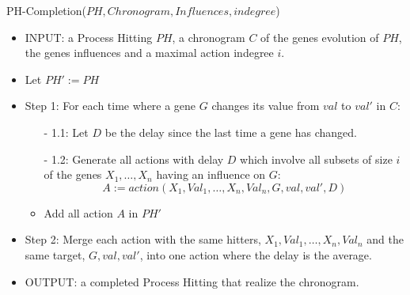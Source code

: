 \begin{algorithm}
	\caption{PH-Completion($PH,Chronogram,Influences,indegree$)}
	\label{alg:PHC_ap}
	\begin{itemize}
		\item INPUT: a Process Hitting $PH$, a chronogram $C$ of the genes evolution of $PH$, the genes influences and a maximal action indegree $i$.

		\item Let $PH' := PH$
		\item Step 1: For each time where a gene $G$ changes its value from $val$ to $val'$ in $C$:

		\begin{itemize}
			\item[-] 1.1: Let $D$ be the delay since the last time a gene has changed.
			\item[-] 1.2: Generate all actions with delay $D$ which involve all subsets of size $i$ of the genes $X_1, \ldots, X_n$ having an influence on $G$:
			$$A := action(X_1,Val_1,\ldots, X_n,Val_n, G, val, val', D)$$
			\item Add all action $A$ in $PH'$
		\end{itemize}
		
		\item Step 2: Merge each action with the same hitters, $X_1,Val_1,\ldots, X_n,Val_n$ and the same target, $G, val, val'$, into one action where the delay is the average.
		\item OUTPUT:  a completed Process Hitting that realize the chronogram.
	\end{itemize}
\end{algorithm}

